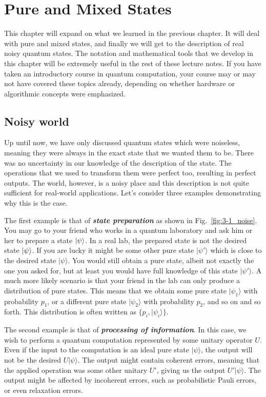 \chapter[Pure and Mixed States]{Pure and Mixed States}
\label{sec:3_pure_mixed}

This chapter will expand on what we learned in the previous chapter.
It will deal with pure and mixed states, and finally we will get to the description of real noisy quantum states.
The notation and mathematical tools that we develop in this chapter will be extremely useful in the rest of these lecture notes. If you have taken an introductory course in quantum computation, your course may or may not have covered these topics already, depending on whether hardware or algorithmic concepts were emphasized.

\section{Noisy world}
\label{sec:3-1_noisy_world}

Up until now, we have only discussed quantum states which were noiseless, meaning they
were always in the exact state that we wanted them to be.
There was no uncertainty in our knowledge of the description of the state.
The operations that we used to transform them were perfect too, resulting in perfect outputs.
The world, however, is a noisy place and this description is not quite sufficient for real-world applications.
Let's consider three examples demonstrating why this is the case.

The first example is that of \textbf{\emph{state preparation}} as shown in Fig.~\ref{fig:3-1_noise}.
You may go to your friend who works in a quantum laboratory and ask him or her to prepare
a state $\left| \psi \right\rangle$.
In a real lab, the prepared state is not the desired state $\left| \psi \right\rangle$.
If you are lucky it might be some other pure state $|\psi'\rangle$ which is close to the desired state $|\psi\rangle$.
You would still obtain a pure state, albeit not exactly the one you asked for, but at least you would have full knowledge of this state $|\psi'\rangle$.
A much more likely scenario is that your friend in the lab can only produce a distribution of pure states.
This means that we obtain some pure state $|\psi_1\rangle$ with probability $p_1$, or a different pure state $|\psi_2\rangle$ with probability $p_2$, and so on and so forth.
This distribution is often written as $\{p_i,|\psi_i\rangle\}$.

The second example is that of \textbf{\emph{processing of information}}.
In this case, we wish to perform a quantum computation represented by some unitary operator $U$.
Even if the input to the computation is an ideal pure state $|\psi\rangle$, the output will not be the desired $U|\psi\rangle$.
The output might contain coherent errors, meaning that the applied operation was some other unitary $U'$, giving us the output $U'|\psi\rangle$.
The output might be affected by incoherent errors, such as probabilistic Pauli errors, or even relaxation errors.

